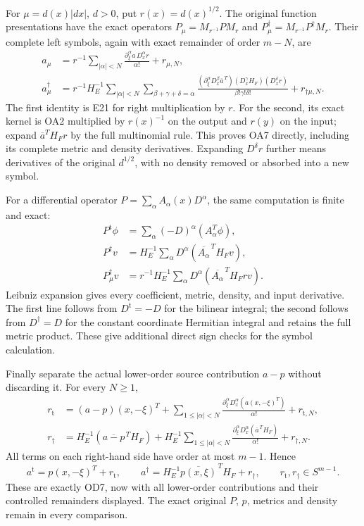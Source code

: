\documentclass[
  11pt,
]{article}
\begin{document}
For \(\mu=d(x)|dx|\), \(d>0\), put \(r(x)=d(x)^{1/2}\). The original
function presentations have the exact operators \(P_\mu=M_{r^{-1}}PM_r\)
and \(P^\dagger_\mu=M_{r^{-1}}P^\dagger M_r\). Their complete left
symbols, again with exact remainder of order \(m-N\), are \[
\begin{aligned}
a_\mu&=r^{-1}\sum_{|\alpha|<N}
 \frac{\partial_\xi^\alpha a\,D_x^\alpha r}{\alpha!}+r_{\mu,N},\\
a^\dagger_\mu&=r^{-1}H_E^{-1}
 \sum_{|\alpha|<N}\sum_{\beta+\gamma+\delta=\alpha}
 \frac{(\partial_\xi^\alpha D_x^\beta\overline a^{\,T})
       (D_x^\gamma H_F)(D_x^\delta r)}
      {\beta!\gamma!\delta!}+r_{\dagger\mu,N}.
\end{aligned}
\tag{OA7}
\] The first identity is E21 for right multiplication by \(r\). For the
second, its exact kernel is OA2 multiplied by \(r(x)^{-1}\) on the
output and \(r(y)\) on the input; expand \(\overline a^TH_Fr\) by the
full multinomial rule. This proves OA7 directly, including its complete
metric and density derivatives. Expanding \(D^\delta r\) further means
derivatives of the original \(d^{1/2}\), with no density removed or
absorbed into a new symbol.

For a differential operator \(P=\sum_\alpha A_\alpha(x)D^\alpha\), the
same computation is finite and exact: \[
\begin{aligned}
P^{\mathrm t}\phi&=\sum_\alpha(-D)^\alpha(A_\alpha^T\phi),\\
P^\dagger v&=H_E^{-1}\sum_\alpha
 D^\alpha(\overline{A_\alpha}^{\,T}H_Fv),\\
P^\dagger_\mu v&=r^{-1}H_E^{-1}\sum_\alpha
 D^\alpha(\overline{A_\alpha}^{\,T}H_Fr v).
\end{aligned}
\tag{OA8}
\] Leibniz expansion gives every coefficient, metric, density, and input
derivative. The first line follows from \(D^{\mathrm t}=-D\) for the
bilinear integral; the second follows from \(D^\dagger=D\) for the
constant coordinate Hermitian integral and retains the full metric
product. These give additional direct sign checks for the symbol
calculation.

Finally separate the actual lower-order source contribution \(a-p\)
without discarding it. For every \(N\geq1\), \[
\begin{aligned}
r_{\mathrm t}&=(a-p)(x,-\xi)^T
 +\sum_{1\leq|\alpha|<N}\frac{
 \partial_\xi^\alpha D_x^\alpha(a(x,-\xi)^T)}{\alpha!}
 +r_{\mathrm t,N},\\
r_\dagger&=H_E^{-1}(\overline{a-p}^{\,T}H_F)
 +H_E^{-1}\sum_{1\leq|\alpha|<N}\frac{
 \partial_\xi^\alpha D_x^\alpha(\overline a^{\,T}H_F)}{\alpha!}
 +r_{\dagger,N}.
\end{aligned}
\tag{OA9}
\] All terms on each right-hand side have order at most \(m-1\). Hence
\[
a^{\mathrm t}=p(x,-\xi)^T+r_{\mathrm t},
\qquad
a^\dagger=H_E^{-1}\overline{p(x,\xi)}^{\,T}H_F+r_\dagger,
\qquad r_{\mathrm t},r_\dagger\in S^{m-1}.
\tag{OA10}
\] These are exactly OD7, now with all lower-order contributions and
their controlled remainders displayed. The exact original \(P\), \(p\),
metrics and density remain in every comparison.
\end{document}
